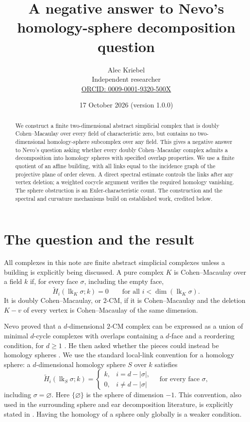 \documentclass[10pt]{article}
\title{A negative answer to Nevo's\\homology-sphere decomposition question}
\author{Alec Kriebel\\
\small Independent researcher\\
\small \href{https://orcid.org/0009-0001-9320-500X}{ORCID: 0009-0001-9320-500X}}
\date{17 October 2026 \quad (version 1.0.0)}
\newcommand{\lk}{\operatorname{lk}}
\begin{document}
\maketitle
\begin{abstract}
We construct a finite two-dimensional abstract simplicial complex that is doubly
Cohen--Macaulay over every field of characteristic zero, but contains no
two-dimensional homology-sphere subcomplex over any field. This gives a negative
answer to Nevo's question asking whether every doubly Cohen--Macaulay complex
admits a decomposition into homology spheres with specified overlap properties.
We use a finite quotient of an affine building, with all links equal to the
incidence graph of the projective plane of order eleven. A direct spectral
estimate controls the links after any vertex deletion; a weighted cocycle
argument verifies the required homology vanishing. The sphere obstruction is
an Euler-characteristic count. The construction and the spectral and curvature
mechanisms build on established work, credited below.
\end{abstract}

\section{The question and the result}
All complexes in this note are finite abstract simplicial complexes unless a
building is explicitly being discussed. A pure complex $K$ is Cohen--Macaulay
over a field $k$ if, for every face $\sigma$, including the empty face,
\[
 \widetilde H_i(\lk_K\sigma;k)=0
 \qquad\text{for all } i<\dim(\lk_K\sigma).
\]
It is doubly Cohen--Macaulay, or $2$-CM, if it is Cohen--Macaulay and the deletion
$K-v$ of every vertex is Cohen--Macaulay of the same dimension.

Nevo proved that a $d$-dimensional $2$-CM complex can be expressed as a union of
minimal $d$-cycle complexes with overlaps containing a $d$-face and a
reordering condition, for $d\geq1$ \cite[Theorem~7]{NevoOWR}
\cite[Theorem~3.4]{Nevo}. He then asked whether the pieces could instead be
homology spheres \cite[Problem~8, p.~961]{NevoOWR}
\cite[Problem~3.7, p.~417]{Nevo}. We use the standard local-link convention for
a homology sphere: a $d$-dimensional homology sphere $S$ over $k$ satisfies
\[
 \widetilde H_i(\lk_S\sigma;k)=
 \begin{cases}
 k,&i=d-|\sigma|,\\
 0,&i\ne d-|\sigma|
 \end{cases}
 \quad\text{for every face }\sigma,
\]
including $\sigma=\varnothing$. Here $\{\varnothing\}$ is the sphere of
dimension $-1$. This convention, also used in the surrounding sphere and ear
decomposition literature, is explicitly stated in \cite[Section~4]{Swartz}.
Having the homology of a sphere only globally is a weaker condition.
\end{document}
